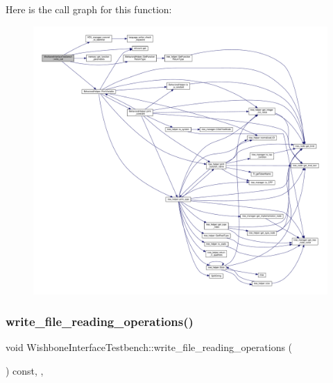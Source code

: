 Here is the call graph for this function\+:
\nopagebreak
\begin{figure}[H]
\begin{center}
\leavevmode
\includegraphics[width=350pt]{de/ded/classWishboneInterfaceTestbench_a6e234d950e3b63e52ab206e23b68531e_cgraph}
\end{center}
\end{figure}
\mbox{\label{classWishboneInterfaceTestbench_a0ceb1c7cca0f25da26b7eff3797489bf}} 
\subsubsection{\texorpdfstring{write\+\_\+file\+\_\+reading\+\_\+operations()}{write\_file\_reading\_operations()}}
{\footnotesize\ttfamily void Wishbone\+Interface\+Testbench\+::write\+\_\+file\+\_\+reading\+\_\+operations (\begin{DoxyParamCaption}{ }\end{DoxyParamCaption}) const\hspace{0.3cm}{\ttfamily [override]}, {\ttfamily [protected]}, {\ttfamily [virtual]}}



